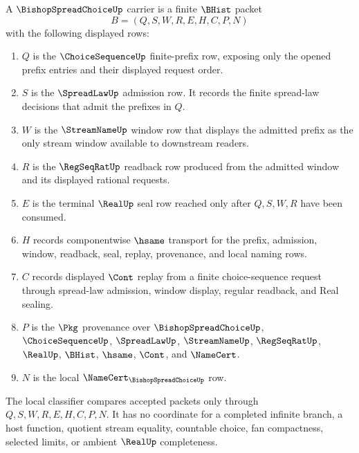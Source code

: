 \begin{definition}
\label{def:bishop-spread-choice-carrier}
A $\BishopSpreadChoiceUp$ carrier is a finite $\BHist$ packet
$$
B=(Q,S,W,R,E,H,C,P,N)
$$
with the following displayed rows:
\begin{enumerate}
\item $Q$ is the $\ChoiceSequenceUp$ finite-prefix row, exposing only the opened prefix entries and their displayed request order.
\item $S$ is the $\SpreadLawUp$ admission row. It records the finite spread-law decisions that admit the prefixes in $Q$.
\item $W$ is the $\StreamNameUp$ window row that displays the admitted prefix as the only stream window available to downstream readers.
\item $R$ is the $\RegSeqRatUp$ readback row produced from the admitted window and its displayed rational requests.
\item $E$ is the terminal $\RealUp$ seal row reached only after $Q,S,W,R$ have been consumed.
\item $H$ records componentwise $\hsame$ transport for the prefix, admission, window, readback, seal, replay, provenance, and local naming rows.
\item $C$ records displayed $\Cont$ replay from a finite choice-sequence request through spread-law admission, window display, regular readback, and Real sealing.
\item $P$ is the $\Pkg$ provenance over $\BishopSpreadChoiceUp$, $\ChoiceSequenceUp$, $\SpreadLawUp$, $\StreamNameUp$, $\RegSeqRatUp$, $\RealUp$, $\BHist$, $\hsame$, $\Cont$, and $\NameCert$.
\item $N$ is the local $\NameCert_{\BishopSpreadChoiceUp}$ row.
\end{enumerate}
The local classifier compares accepted packets only through $Q,S,W,R,E,H,C,P,N$. It has no coordinate for a completed infinite branch, a host function, quotient stream equality, countable choice, fan compactness, selected limits, or ambient $\RealUp$ completeness.
\end{definition}

